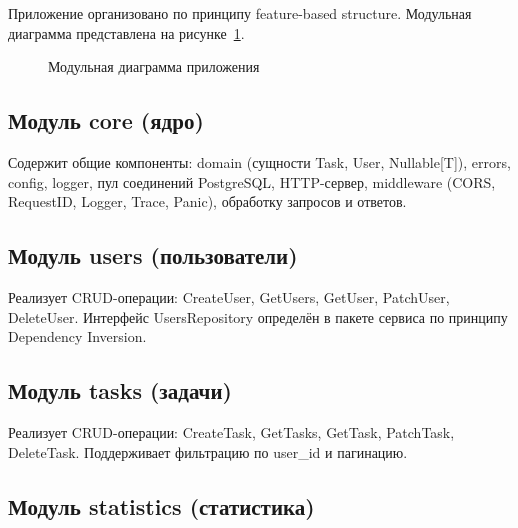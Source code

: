 \documentclass[a4paper,14pt]{extarticle}
\begin{document}
Приложение организовано по принципу feature-based structure. Модульная диаграмма представлена на рисунке~\ref{fig:modules}.

\begin{figure}[H]
\centering
{}
\caption{Модульная диаграмма приложения}\label{fig:modules}
\end{figure}

\subsection{Модуль core (ядро)}

Содержит общие компоненты: domain (сущности Task, User, Nullable[T]), errors, config, logger, пул соединений PostgreSQL, HTTP-сервер, middleware (CORS, RequestID, Logger, Trace, Panic), обработку запросов и ответов.

\subsection{Модуль users (пользователи)}

Реализует CRUD-операции: CreateUser, GetUsers, GetUser, PatchUser, DeleteUser. Интерфейс UsersRepository определён в пакете сервиса по принципу Dependency Inversion.

\subsection{Модуль tasks (задачи)}

Реализует CRUD-операции: CreateTask, GetTasks, GetTask, PatchTask, DeleteTask. Поддерживает фильтрацию по user\_id и пагинацию.

\subsection{Модуль statistics (статистика)}
\end{document}
